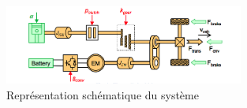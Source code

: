 \begin{figure}[b]
	\begin{center}
	\includegraphics[width=0.7\textwidth]{images/Systeme_VEH.png}
	\caption{Représentation schématique du système}\label{img:Schéma système VEH}
	\end{center}
\end{figure}
\FloatBarrier 

		